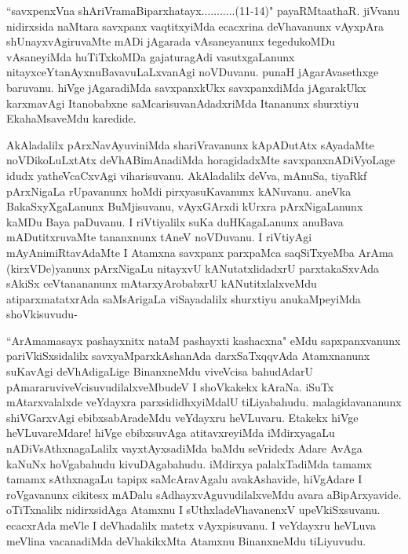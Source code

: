 
\begin{artha}
``savxpenxVna shAriVramaBiparxhatayx...........(11-14)" payaRMta\break athaR. jiVvanu nidirxsida naMtara savxpanx vaqtitxyiMda ecacxrina deVhavanunx vAyxpAra shUnayxvAgiruvaMte mADi jAgarada vAsaneyanunx tegedukoMDu vAsaneyiMda huTiTxkoMDa gajaturagAdi vasutxgaLanunx nitayxceYtanAyxnuBavavuLaLxvanAgi noVDuvanu. punaH jAgarAvasethxge baruvanu. hiVge jAgaradiMda savxpanxkUkx savxpanxdiMda jAgarakUkx karxmavAgi Itanobabxne saMcarisuvanAdadxriMda Itananunx shurxtiyu EkahaMsaveMdu karedide. 
\end{artha}

\begin{artha}
AkAladalilx pArxNavAyuviniMda shariVravanunx kApADutAtx sAyadaMte noVDikoLuLxtAtx deVhABimAnadiMda horagidadxMte savxpanx\-\break nADiVyoLage idudx yatheVcaCxvAgi viharisuvanu. AkAladalilx deVva, mAnuSa, tiyaRkf pArxNigaLa rUpavanunx hoMdi pirxyasuKavanunx kANuvanu. aneVka BakaSxyXgaLanunx BuMjisuvanu, vAyxGArxdi kUrxra pArxNigaLanunx kaMDu Baya paDuvanu. I riVtiyalilx suKa duHKagaLanunx anuBava mADutitxruvaMte tananxnunx tAneV noVDuvanu. I riVtiyAgi mAyAnimiRtavAdaMte I Atamxna savxpanx parxpaMca saqSiTxyeMba ArAma (kirxVDe)yanunx pArxNigaLu nitayxvU kANutatxlidadxrU parxtakaSxvAda sAkiSx ceVtanananunx mAtarxyArobabxrU kANutitxlalxveMdu atiparxmatatxrAda saMsArigaLa viSayadalilx shurxtiyu anukaMpeyiMda shoVkisuvudu-
\end{artha}

\begin{artha}%
``ArAmamasayx pashayxnitx nataM pashayxti kashacxna" eMdu sapxpanxvanunx pariVkiSxsidalilx savxyaMparxkAshanAda darxSaTxqqvAda Atamxnanunx suKavAgi deVhAdigaLige BinanxneMdu viveVcisa bahudAdarU pAmararu\break viveVcisuvudilalxveMbudeV I shoVkakekx kAraNa. iSuTx mAtarxvalalxde veYdayxra parxsididhxyiMdalU tiLiyabahudu. malagidavananunx shiVGarxvAgi ebibxsabAradeMdu veYdayxru heVLuvaru. Etakekx hiVge heVLuvareMdare! hiVge ebibxsuvAga atitavxreyiMda iMdirxyagaLu nADiVsAthxnagaLalilx vayxtAyxsadiMda baMdu seVridedx Adare AvAga kaNuNx hoVgabahudu kivuDAgabahudu. iMdirxya palalxTadiMda tamamx tamamx sAthxnagaLu tapipx saMcAravAgalu avakAshavide, hiVgAdare I roVgavanunx cikitesx mADalu sAdhayxvAguvudilalxveMdu avara aBipArxyavide. oTiTxnalilx nidirxsidAga Atamxnu I sUthxladeVhavanenxV upeVkiSxsuvanu. ecacxrAda meVle I deVhadalilx matetx vAyxpisuvanu. I veYdayxru heVLuva meVlina vacanadiMda deVhakikxMta Atamxnu BinanxneMdu tiLiyuvudu.  
\end{artha}

